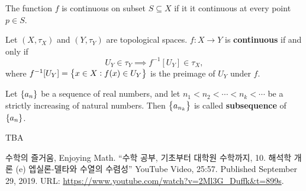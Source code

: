\documentclass[11pt,openany]{article}
\begin{document}
\begin{remark}
	The function $f$ is continuous on subset $S\subseteq X$ if it it continuous at every point $p\in S$.
\end{remark}
\begin{remark}
	Let $(X,\tau_X)$ and $(Y,\tau_Y)$ are topological spaces. $f:X\to Y$ is \textbf{continuous} if and only if $$U_Y\in\tau_Y\implies f^{-1}[U_Y]\in\tau_X,$$ where $f^{-1}[U_Y]=\set{x\in X:f(x)\in U_Y}$ is the preimage of $U_Y$ under $f$.
\end{remark}

\begin{note}[Subsequence]
	Let $\set{a_n}$ be a sequence of real numbers, and let $n_1<n_2<\cdots<n_k<\cdots$ be a strictly increasing of natural numbers. Then $\set{a_{n_k}}$ is called \textbf{subsequence} of $\set{a_n}$.
\end{note}


\begin{note}
	TBA
\end{note}
\vfill

\begin{thebibliography}{9}
	수학의 즐거움, Enjoying Math. ``수학 공부, 기초부터 대학원 수학까지, 10. 해석학 개론 (e) 엡실론-델타와 수열의 수렴성'' YouTube Video, 25:57. Published 
	September 29, 2019. URL: \url{https://www.youtube.com/watch?v=2Ml3G_Duffk&t=899s}.
\end{thebibliography}
\end{document}
